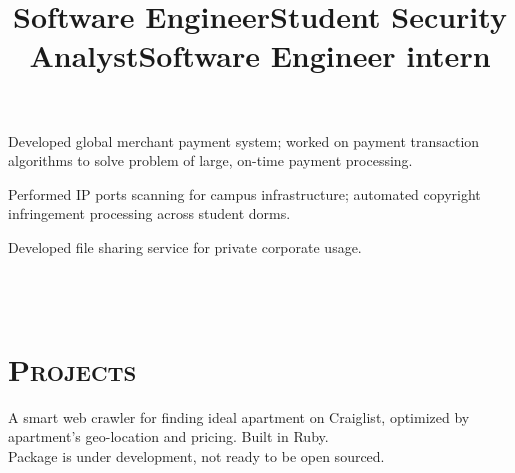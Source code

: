 \begin{resume}
\title{Software Engineer}
\begin{position}	
Developed global merchant payment system; worked on payment transaction algorithms to solve problem of large, on-time payment processing.
\end{position}

\title{Student Security Analyst}
\begin{position}
Performed IP ports scanning for campus infrastructure; automated copyright infringement processing across student dorms.
\end{position}

\title{Software Engineer intern}
\begin{position}
Developed file sharing service for private corporate usage.
\end{position}


\begin{formatb}
  \\
  \body\\
\end{formatb}

\section{\textsc{Projects}}

\begin{position}
A smart web crawler for finding ideal apartment on Craiglist, optimized by apartment's geo-location and pricing. Built in Ruby. \\
Package is under development, not ready to be open sourced.
\end{position}


\end{resume}
